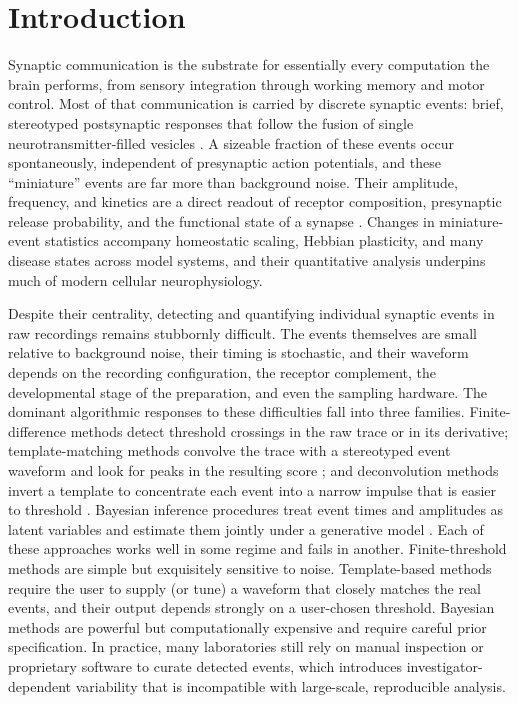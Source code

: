 \documentclass[11pt]{article}
\begin{document}
\section{Introduction}

Synaptic communication is the substrate for essentially every computation the
brain performs, from sensory integration through working memory and motor
control. Most of that communication is carried by discrete synaptic events:
brief, stereotyped postsynaptic responses that follow the fusion of single
neurotransmitter-filled vesicles \citep{kaeser2014release}. A sizeable
fraction of these events occur spontaneously, independent of presynaptic
action potentials, and these ``miniature'' events are far more than
background noise. Their amplitude, frequency, and kinetics are a direct
readout of receptor composition, presynaptic release probability, and the
functional state of a synapse \citep{kavalali2015mechanisms, huganir2013ampars,
reese2015spontaneous}. Changes in miniature-event statistics accompany
homeostatic scaling, Hebbian plasticity, and many disease states across model
systems, and their quantitative analysis underpins much of modern cellular
neurophysiology.

Despite their centrality, detecting and quantifying individual synaptic events
in raw recordings remains stubbornly difficult. The events themselves are
small relative to background noise, their timing is stochastic, and their
waveform depends on the recording configuration, the receptor complement, the
developmental stage of the preparation, and even the sampling hardware. The
dominant algorithmic responses to these difficulties fall into three families.
Finite-difference methods detect threshold crossings in the raw trace or in
its derivative; template-matching methods convolve the trace with a
stereotyped event waveform and look for peaks in the resulting score
\citep{clements1997detection}; and deconvolution methods invert a template to
concentrate each event into a narrow impulse that is easier to threshold
\citep{pernia2012deconvolution}. Bayesian inference procedures treat event
times and amplitudes as latent variables and estimate them jointly under a
generative model \citep{merel2016bayesian}. Each of these approaches works
well in some regime and fails in another. Finite-threshold methods are simple
but exquisitely sensitive to noise. Template-based methods require the user to
supply (or tune) a waveform that closely matches the real events, and their
output depends strongly on a user-chosen threshold. Bayesian methods are
powerful but computationally expensive and require careful prior
specification. In practice, many laboratories still rely on manual inspection
or proprietary software \citep{mori2024simplyfire} to curate detected events,
which introduces investigator-dependent variability that is incompatible with
large-scale, reproducible analysis.
\end{document}
